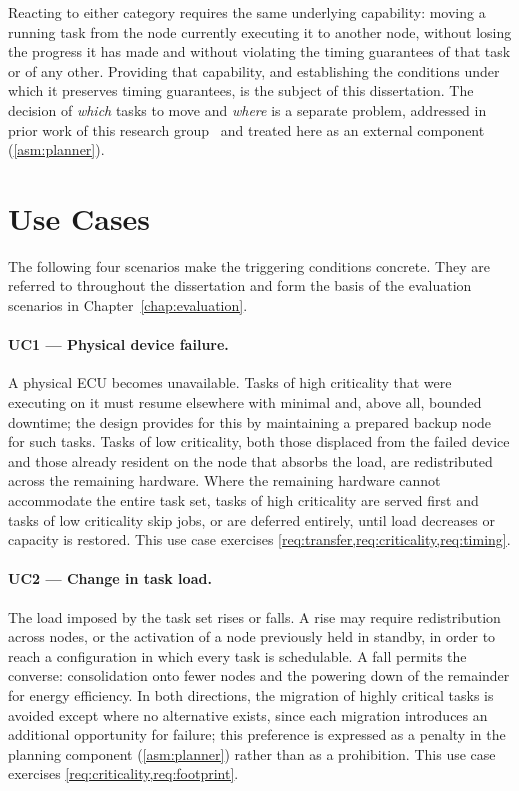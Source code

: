 Reacting to either category requires the same underlying capability: moving a
running task from the node currently executing it to another node, without
losing the progress it has made and without violating the timing guarantees of
that task or of any other. Providing that capability, and establishing the
conditions under which it preserves timing guarantees, is the subject of this
dissertation. The decision of \emph{which} tasks to move and \emph{where} is a
separate problem, addressed in prior work of this research
group~\parencite{delgadillo_jlpea22} and treated here as an external component
(\cref{asm:planner}).

\section{Use Cases}\label{section:approachusecases}

The following four scenarios make the triggering conditions concrete. They are
referred to throughout the dissertation and form the basis of the evaluation
scenarios in Chapter~\ref{chap:evaluation}.

\paragraph{UC1 --- Physical device failure.}
A physical ECU becomes unavailable. Tasks of high criticality that were
executing on it must resume elsewhere with minimal and, above all, bounded
downtime; the design provides for this by maintaining a prepared backup node
for such tasks. Tasks of low criticality, both those displaced from the failed
device and those already resident on the node that absorbs the load, are
redistributed across the remaining hardware. Where the remaining hardware
cannot accommodate the entire task set, tasks of high criticality are served
first and tasks of low criticality skip jobs, or are deferred entirely, until
load decreases or capacity is restored. This use case exercises
\cref{req:transfer,req:criticality,req:timing}.

\paragraph{UC2 --- Change in task load.}
The load imposed by the task set rises or falls. A rise may require
redistribution across nodes, or the activation of a node previously held in
standby, in order to reach a configuration in which every task is schedulable.
A fall permits the converse: consolidation onto fewer nodes and the powering
down of the remainder for energy efficiency. In both directions, the migration
of highly critical tasks is avoided except where no alternative exists, since
each migration introduces an additional opportunity for failure; this
preference is expressed as a penalty in the planning component
(\cref{asm:planner}) rather than as a prohibition. This use case exercises
\cref{req:criticality,req:footprint}.

